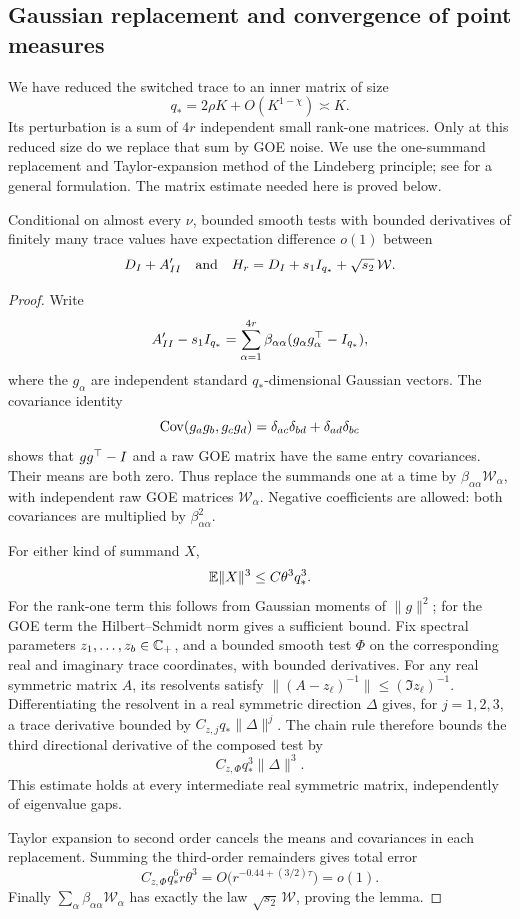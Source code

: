\subsection{Gaussian replacement and convergence of point measures}

We have reduced the switched trace to an inner matrix of size
\[
 q_*=2\rho K+O(K^{1-\chi})\asymp K.
\]
Its perturbation is a sum of \(4r\) independent small rank-one matrices.
Only at this reduced size do we replace that sum by GOE noise.
We use the one-summand replacement and Taylor-expansion method of the
Lindeberg principle; see \citet{ChatterjeeLindeberg} for a general
formulation. The matrix estimate needed here is proved below.

\begin{lemma}\label{sw:lindeberg}
Conditional on almost every \(\nu\), bounded smooth tests with bounded
derivatives of finitely many trace values have expectation difference
\(o(1)\) between
\[
 D_I+A'_{II}
 \quad\hbox{and}\quad
 H_r=D_I+s_1I_{q_*}+\sqrt{s_2}\,\mathcal W.
\]
\end{lemma}

\begin{proof}
Write
\[
 A'_{II}-s_1I_{q_*}
 =\sum_{\alpha=1}^{4r}
 \beta_{\alpha\alpha}(g_\alpha g_\alpha^\top-I_{q_*}),
\]
where the \(g_\alpha\) are independent standard \(q_*\)-dimensional
Gaussian vectors. The covariance identity
\[
 \operatorname{Cov}(g_ag_b,g_cg_d)
 =\delta_{ac}\delta_{bd}+\delta_{ad}\delta_{bc}
\]
shows that \(gg^\top-I\) and a raw GOE matrix have the same entry
covariances. Their means are both zero. Thus replace the summands one at
a time by \(\beta_{\alpha\alpha}\mathcal W_\alpha\), with independent raw
GOE matrices \(\mathcal W_\alpha\). Negative coefficients are allowed:
both covariances are multiplied by \(\beta_{\alpha\alpha}^2\).

For either kind of summand \(X\),
\[
 \mathbb E\|X\|^3\le C\theta^3q_*^3.
\]
For the rank-one term this follows from Gaussian moments of \(\|g\|^2\);
for the GOE term the Hilbert--Schmidt norm gives a sufficient bound.
Fix spectral parameters \(z_1,\ldots,z_b\in\mathbb C_+\), and a bounded smooth
test \(\Phi\) on the corresponding real and imaginary trace coordinates,
with bounded derivatives. For any real symmetric matrix \(A\), its
resolvents satisfy \(\|(A-z_\ell)^{-1}\|\le(\Im z_\ell)^{-1}\).
Differentiating the resolvent in a real symmetric direction \(\Delta\)
gives, for \(j=1,2,3\), a trace derivative bounded by
\(C_{z,j}q_*\|\Delta\|^j\). The chain rule therefore bounds the third
directional derivative of the composed test by
\[
 C_{z,\Phi}q_*^3\|\Delta\|^3.
\]
This estimate holds at every intermediate real symmetric matrix,
independently of eigenvalue gaps.

Taylor expansion to second order cancels the means and covariances in
each replacement. Summing the third-order remainders gives total error
\[
 C_{z,\Phi}q_*^6 r\theta^3
 =O\bigl(r^{-0.44+(3/2)\tau}\bigr)=o(1).
\]
Finally \(\sum_\alpha\beta_{\alpha\alpha}\mathcal W_\alpha\) has exactly
the law \(\sqrt{s_2}\,\mathcal W\), proving the lemma.
\end{proof}

